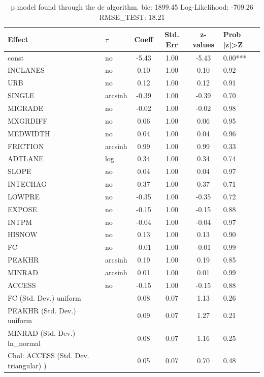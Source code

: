 \begin{table}
	\caption{p model found through the de algorithm. bic: 1899.45 Log-Likelihood: -709.26 RMSE_TEST: 18.21}
	\begin{center}
		\begin{tabular}{|l|l|c|c|c|l|}
			\hline
			Effect & $\tau$ & Coeff & Std. Err & z-values & Prob |z|>Z \\
			\hline
			const & no & -5.43 & 1.00 & -5.43 & 0.00*** \\
			\hline
			INCLANES & no & 0.10 & 1.00 & 0.10 & 0.92 \\
			\hline
			URB & no & 0.12 & 1.00 & 0.12 & 0.91 \\
			\hline
			SINGLE & arcsinh & -0.39 & 1.00 & -0.39 & 0.70 \\
			\hline
			MIGRADE & no & -0.02 & 1.00 & -0.02 & 0.98 \\
			\hline
			MXGRDIFF & no & 0.06 & 1.00 & 0.06 & 0.95 \\
			\hline
			MEDWIDTH & no & 0.04 & 1.00 & 0.04 & 0.96 \\
			\hline
			FRICTION & arcsinh & 0.99 & 1.00 & 0.99 & 0.33 \\
			\hline
			ADTLANE & log & 0.34 & 1.00 & 0.34 & 0.74 \\
			\hline
			SLOPE & no & 0.04 & 1.00 & 0.04 & 0.97 \\
			\hline
			INTECHAG & no & 0.37 & 1.00 & 0.37 & 0.71 \\
			\hline
			LOWPRE & no & -0.35 & 1.00 & -0.35 & 0.72 \\
			\hline
			EXPOSE & no & -0.15 & 1.00 & -0.15 & 0.88 \\
			\hline
			INTPM & no & -0.04 & 1.00 & -0.04 & 0.97 \\
			\hline
			HISNOW & no & 0.13 & 1.00 & 0.13 & 0.90 \\
			\hline
			FC & no & -0.01 & 1.00 & -0.01 & 0.99 \\
			\hline
			PEAKHR & arcsinh & 0.19 & 1.00 & 0.19 & 0.85 \\
			\hline
			MINRAD & arcsinh & 0.01 & 1.00 & 0.01 & 0.99 \\
			\hline
			ACCESS & no & -0.15 & 1.00 & -0.15 & 0.88 \\
			\hline
			FC (Std. Dev.) uniform &  & 0.08 & 0.07 & 1.13 & 0.26 \\
			\hline
			PEAKHR (Std. Dev.) uniform &  & 0.09 & 0.07 & 1.27 & 0.21 \\
			\hline
			MINRAD (Std. Dev.) ln_normal &  & 0.08 & 0.07 & 1.16 & 0.25 \\
			\hline
			 Chol: ACCESS (Std. Dev. triangular) ) &  & 0.05 & 0.07 & 0.70 & 0.48 \\
			\hline
		\end{tabular}
	\end{center}
\end{table}